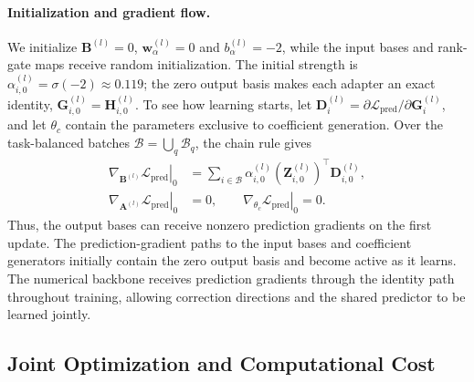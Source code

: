 \documentclass[journal]{IEEEtran}
\begin{document}
\paragraph{Initialization and gradient flow.}
We initialize $\mathbf B^{(l)}=0$, $\mathbf w_\alpha^{(l)}=0$ and $b_\alpha^{(l)}=-2$, while the input bases and rank-gate maps receive random initialization. The initial strength is $\alpha_{i,0}^{(l)}=\sigma(-2)\approx0.119$; the zero output basis makes each adapter an exact identity, $\mathbf G_{i,0}^{(l)}=\mathbf H_{i,0}^{(l)}$. To see how learning starts, let $\mathbf D_i^{(l)}=\partial\mathcal L_{\mathrm{pred}}/\partial\mathbf G_i^{(l)}$, and let $\theta_c$ contain the parameters exclusive to coefficient generation. Over the task-balanced batches $\mathcal B=\bigcup_q\mathcal B_q$, the chain rule gives
\begin{equation}
\label{eq:initial-gradient}
\begin{aligned}
\left.\nabla_{\mathbf B^{(l)}}\mathcal L_{\mathrm{pred}}\right|_0
&=\sum_{i\in\mathcal B}\alpha_{i,0}^{(l)}
(\mathbf Z_{i,0}^{(l)})^\top\mathbf D_{i,0}^{(l)},\\
\left.\nabla_{\mathbf A^{(l)}}\mathcal L_{\mathrm{pred}}\right|_0&=0,
\qquad\left.\nabla_{\theta_c}\mathcal L_{\mathrm{pred}}\right|_0=0.
\end{aligned}
\end{equation}
Thus, the output bases can receive nonzero prediction gradients on the first update. The prediction-gradient paths to the input bases and coefficient generators initially contain the zero output basis and become active as it learns. The numerical backbone receives prediction gradients through the identity path throughout training, allowing correction directions and the shared predictor to be learned jointly.

\subsection{Joint Optimization and Computational Cost}
\end{document}
